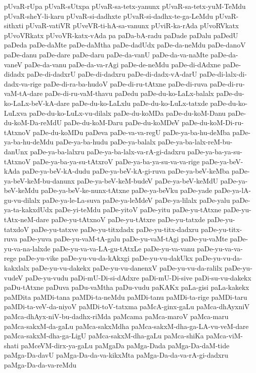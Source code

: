 {pUvaR-rUpa
pUvaR-sUtxpa
pUvaR-sa-tetx-yanunx
pUvaR-sa-tetx-yuM-TeMdu
pUvaR-sheY-li-karu
pUvaR-si-dadhxte
pUvaR-si-dadhx-te-ga-LeMdu
pUvaR-sithxti
pUvaR-vatiVR
pUveVR-ti-hA-sa-vanunx
pUviR-ka-rAda
pUvoRVkatx
pUvoVRkatx
pUvoVR-katx-vAda
pa
paDa-bA-radu
paDade
paDalu
paDedU
paDeda
paDe-daMte
paDe-daMtha
paDe-dadUdx
paDe-da-neMdu
paDe-danoV
paDe-danu
paDe-dare
paDe-daru
paDe-da-vanU
paDe-da-va-naMte
paDe-da-vaneV
paDe-da-vanu
paDe-da-va-rAgi
paDe-de-neMdu
paDe-di-dAdxne
paDe-didadx
paDe-di-dadxrU
paDe-di-dadxru
paDe-di-dadx-vA-darU
paDe-di-lalx-di-dadx-va-rige
paDe-di-ra-ba-hudoV
paDe-di-ru-tAtxne
paDe-di-ruva
paDe-di-ru-vaM-tA-dare
paDe-di-ru-vaM-thavu
paDedu
paDe-du-ko-LaLx-balalx
paDe-du-ko-LaLx-beV-kA-dare
paDe-du-ko-LaLxlu
paDe-du-ko-LuLx-tatxde
paDe-du-ko-LuLxva
paDe-du-ko-LuLx-vu-dilalx
paDe-du-koMDa
paDe-du-koM-Danu
paDe-du-koM-Da-reMdU
paDe-du-koM-Daru
paDe-du-koMDeV
paDe-du-koM-Di-ru-tAtxnoV
paDe-du-koMDu
paDeva
paDe-va-va-regU
paDe-ya-ba-hu-deMba
paDe-ya-ba-hu-deMdu
paDe-ya-ba-hudu
paDe-ya-balalx
paDe-ya-ba-lalx-reM-bu-danUnx
paDe-ya-ba-lalxru
paDe-ya-ba-lalx-va-rA-gi-dadxru
paDe-ya-ba-ya-su-tAtxnoV
paDe-ya-ba-ya-su-tAtxroV
paDe-ya-ba-ya-su-va-va-rige
paDe-ya-beV-kAda
paDe-ya-beV-kA-dudu
paDe-ya-beV-kA-gi-ruva
paDe-ya-beV-keMba
paDe-ya-beV-keM-bu-danunx
paDe-ya-beV-keM-budeV
paDe-ya-beV-keMdU
paDe-ya-beV-keMdu
paDe-ya-beV-ke-nunx-tAtxne
paDe-ya-beVku
paDe-yade
paDe-ya-lA-gu-vu-dilalx
paDe-ya-le-La-suva
paDe-ya-leMdeV
paDe-ya-lilalx
paDe-yalu
paDe-ya-ta-kakxdUdx
paDe-yi-teMdu
paDe-yitoV
paDe-yitu
paDe-yu-tAtxne
paDe-yu-tAtx-neM-dare
paDe-yu-tAtxnoV
paDe-yu-tAtxre
paDe-yu-tatxde
paDe-yu-tatxdoV
paDe-yu-tatxve
paDe-yu-titxdadx
paDe-yu-titx-dadxru
paDe-yu-titx-ruva
paDe-yuva
paDe-yu-vaM-tA-galu
paDe-yu-vaM-tAgi
paDe-yu-vaMte
paDe-yu-va-na-lalxde
paDe-yu-va-va-LA-gu-tAtxLe
paDe-yu-va-vanu
paDe-yu-va-va-rege
paDe-yu-vike
paDe-yu-vu-da-kAkxgi
paDe-yu-vu-dakUkx
paDe-yu-vu-da-kakxlalx
paDe-yu-vu-dakekx
paDe-yu-vu-danenxV
paDe-yu-vu-da-ralilx
paDe-yu-vudeV
paDe-yu-vudu
paDi-mU-Di-si-dAdxre
paDi-mU-Di-sive
paDi-su-vu-dakekx
paDu-tAtxne
paDuva
paDu-vaMtha
paDu-vudu
paKAKx
paLa-gisi
paLa-kakekx
paMDita
paMDi-tana
paMDi-ta-neMdu
paMDi-tanu
paMDi-ta-rige
paMDi-taru
paMDi-ta-veV-da-niyoV
paMDi-toV-tatxma
paMcA-ginx-gaLu
paMca-dhAyxniV
paMca-dhAyx-niV-bu-dadhx-riMda
paMcama
paMca-maroV
paMca-maru
paMca-sakxM-da-gaLu
paMca-sakxMdha
paMca-sakxM-dha-ga-LA-vu-veM-dare
paMca-sakxM-dha-ga-LigU
paMca-sakxM-dha-gaLu
paMca-shiKa
paMca-viM-shati
paMceVM-dirx-ya-gaLu
paMgaDa
paMga-Dada
paMga-Da-daM-tide
paMga-Da-davU
paMga-Da-da-va-kikxMta
paMga-Da-da-va-rA-gi-dadxru
paMga-Da-da-va-reMdu
}
